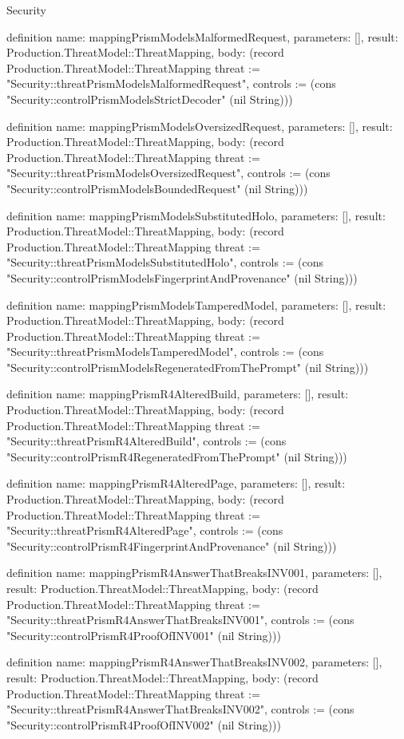 \begin{lexlean}{Security}
\begin{semanticmodule}
definition{
  name: mappingPrismModelsMalformedRequest,
  parameters: [],
  result: Production.ThreatModel::ThreatMapping,
  body: (record Production.ThreatModel::ThreatMapping {threat := "Security::threatPrismModelsMalformedRequest", controls := (cons "Security::controlPrismModelsStrictDecoder" (nil String))})
}

definition{
  name: mappingPrismModelsOversizedRequest,
  parameters: [],
  result: Production.ThreatModel::ThreatMapping,
  body: (record Production.ThreatModel::ThreatMapping {threat := "Security::threatPrismModelsOversizedRequest", controls := (cons "Security::controlPrismModelsBoundedRequest" (nil String))})
}

definition{
  name: mappingPrismModelsSubstitutedHolo,
  parameters: [],
  result: Production.ThreatModel::ThreatMapping,
  body: (record Production.ThreatModel::ThreatMapping {threat := "Security::threatPrismModelsSubstitutedHolo", controls := (cons "Security::controlPrismModelsFingerprintAndProvenance" (nil String))})
}

definition{
  name: mappingPrismModelsTamperedModel,
  parameters: [],
  result: Production.ThreatModel::ThreatMapping,
  body: (record Production.ThreatModel::ThreatMapping {threat := "Security::threatPrismModelsTamperedModel", controls := (cons "Security::controlPrismModelsRegeneratedFromThePrompt" (nil String))})
}

definition{
  name: mappingPrismR4AlteredBuild,
  parameters: [],
  result: Production.ThreatModel::ThreatMapping,
  body: (record Production.ThreatModel::ThreatMapping {threat := "Security::threatPrismR4AlteredBuild", controls := (cons "Security::controlPrismR4RegeneratedFromThePrompt" (nil String))})
}

definition{
  name: mappingPrismR4AlteredPage,
  parameters: [],
  result: Production.ThreatModel::ThreatMapping,
  body: (record Production.ThreatModel::ThreatMapping {threat := "Security::threatPrismR4AlteredPage", controls := (cons "Security::controlPrismR4FingerprintAndProvenance" (nil String))})
}

definition{
  name: mappingPrismR4AnswerThatBreaksINV001,
  parameters: [],
  result: Production.ThreatModel::ThreatMapping,
  body: (record Production.ThreatModel::ThreatMapping {threat := "Security::threatPrismR4AnswerThatBreaksINV001", controls := (cons "Security::controlPrismR4ProofOfINV001" (nil String))})
}

definition{
  name: mappingPrismR4AnswerThatBreaksINV002,
  parameters: [],
  result: Production.ThreatModel::ThreatMapping,
  body: (record Production.ThreatModel::ThreatMapping {threat := "Security::threatPrismR4AnswerThatBreaksINV002", controls := (cons "Security::controlPrismR4ProofOfINV002" (nil String))})
}


\end{semanticmodule}
\end{lexlean}
